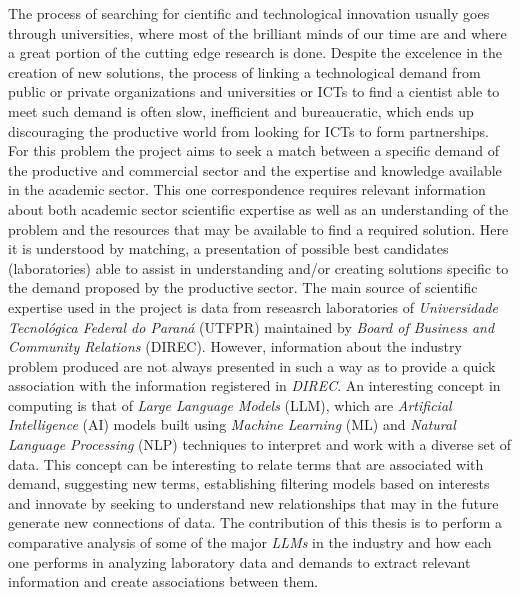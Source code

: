 \begin{abstractutfpr}
    The process of searching for cientific and technological innovation usually goes through universities, where most of the brilliant minds of our time are and where a great portion of the cutting edge research is done. Despite the excelence in the creation of new solutions, the process of linking a technological demand from public or private organizations and universities or ICTs to find a cientist able to meet such demand is often slow, inefficient and bureaucratic, which ends up discouraging the productive world from looking for ICTs to form partnerships. For this problem the project aims to seek a match between a specific demand of the productive and commercial sector and the expertise and knowledge available in the academic sector. This one correspondence requires relevant information about both academic sector scientific expertise as well as an understanding of the problem and the resources that may be available to find a required solution. Here it is understood by matching, a presentation of possible best candidates (laboratories) able to assist in understanding and/or creating solutions specific to the demand proposed by the productive sector. The main source of scientific expertise used in the project is data from reseasrch laboratories of \emph{Universidade Tecnológica Federal do Paraná} (UTFPR) maintained by \emph{Board of Business and Community Relations} (DIREC). However, information about the industry problem produced are not always presented in such a way as to provide a quick association with the information registered in \emph{DIREC}.
    An interesting concept in computing is that of \emph{Large Language Models} (LLM), which are \emph{Artificial Intelligence} (AI) models built using \emph{Machine Learning} (ML) and \emph{Natural Language Processing} (NLP) techniques to interpret and work with a diverse set of data. This concept can be interesting to relate terms that are associated with demand, suggesting new terms, establishing filtering models based on interests and innovate by seeking to understand new relationships that may in the future generate new connections of data. The contribution of this thesis is to perform a comparative analysis of some of the major \emph{LLMs} in the industry and how each one performs in analyzing laboratory data and demands to extract relevant information and create associations between them.
\end{abstractutfpr}
